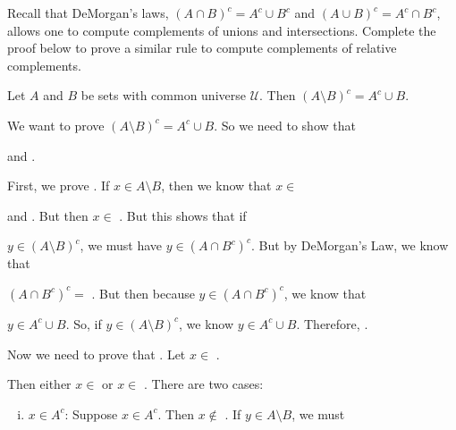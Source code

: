 \documentclass[12pt,letterpaper]{exam}
\begin{document}
\begin{questions}
\newpage
\question[10] Recall that DeMorgan's laws, $(A \cap B)^c= A^c \cup B^c$ and $(A \cup B)^c= A^c \cap B^c$, allows one to compute complements of unions and intersections. Complete the proof below to prove a similar rule to compute complements of relative complements. \pspace

 Let $A$ and $B$ be sets with common universe $\mathcal{U}$. Then $(A \setminus B)^c= A^c \cup B$. \pspace

 We want to prove $(A \setminus B)^c= A^c \cup B$. So we need to show that \underline{\hspace{4cm}} \pspace

and \underline{\hspace{4cm}}. \pspace \pspace


First, we prove \underline{\hspace{4cm}}. If $x \in A \setminus B$, then we know that $x \in$ \underline{\hspace{4cm}} \pspace 

and \underline{\hspace{4cm}}. But then $x \in$ \underline{\hspace{4cm}}. But this shows that if \pspace

$y \in (A \setminus B)^c$, we must have $y \in (A \cap B^c)^c$. But by DeMorgan's Law, we know that \pspace

$(A \cap B^c)^c=$ \underline{\hspace{4cm}}. But then because $y \in (A \cap B^c)^c$, we know that \pspace

$y \in A^c \cup B$. So, if $y \in (A \setminus B)^c$, we know $y \in A^c \cup B$. Therefore, \underline{\hspace{4cm}}. \pspace \pspace


Now we need to prove that \underline{\hspace{4cm}}. Let $x \in$ \underline{\hspace{4cm}}. \pspace

Then either $x \in$ \underline{\hspace{4cm}} or $x \in$ \underline{\hspace{4cm}}. There are two \pspace cases: \pspace

	\begin{enumerate}[(i)]
	\item $x \in A^c$: Suppose $x \in A^c$. Then $x \notin$ \underline{\hspace{4cm}}. If $y \in A \setminus B$, we must \pspace
	

\end{enumerate}
\end{questions}
\end{document}
